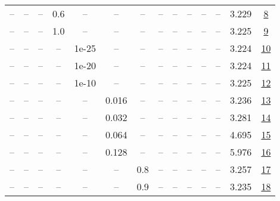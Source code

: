\begin{table}[H]
\begin{tabular}{cccccccccccccc}
-- & -- & -- & 0.6 & -- & -- & -- & -- & -- & -- & -- & -- & 3.229 & \href{https://wandb.ai/stanford-mercury/optimizer-scaling/runs/sweep-300m-6B-muon4ce9f6lr0.008-wd0.1-minlr0-warmup0-b10.8-b20.9-073a16}{8} \\
-- & -- & -- & 1.0 & -- & -- & -- & -- & -- & -- & -- & -- & 3.225 & \href{https://wandb.ai/stanford-mercury/optimizer-scaling/runs/sweep-300m-6B-muon202a7elr0.008-wd0.1-minlr0-warmup0-b10.8-b20.9-73a2de}{9} \\
-- & -- & -- & -- & 1e-25 & -- & -- & -- & -- & -- & -- & -- & 3.224 & \href{https://wandb.ai/stanford-mercury/optimizer-scaling/runs/sweep-300m-6B-muone40a7blr0.008-wd0.1-minlr0-warmup0-b10.8-b20.9-033569}{10} \\
-- & -- & -- & -- & 1e-20 & -- & -- & -- & -- & -- & -- & -- & 3.224 & \href{https://wandb.ai/stanford-mercury/optimizer-scaling/runs/sweep-300m-6B-muon77a589lr0.008-wd0.1-minlr0-warmup0-b10.8-b20.9-ccc1c0}{11} \\
-- & -- & -- & -- & 1e-10 & -- & -- & -- & -- & -- & -- & -- & 3.225 & \href{https://wandb.ai/stanford-mercury/optimizer-scaling/runs/sweep-300m-6B-muon7e5c17lr0.008-wd0.1-minlr0-warmup0-b10.8-b20.9-a739dc}{12} \\
-- & -- & -- & -- & -- & 0.016 & -- & -- & -- & -- & -- & -- & 3.236 & \href{https://wandb.ai/stanford-mercury/optimizer-scaling/runs/sweep-300m-6B-muon5f44d2lr0.016-wd0.1-minlr0-warmup0-b10.8-b20.9-e34d49}{13} \\
-- & -- & -- & -- & -- & 0.032 & -- & -- & -- & -- & -- & -- & 3.281 & \href{https://wandb.ai/stanford-mercury/optimizer-scaling/runs/sweep-300m-6B-muond0d176lr0.032-wd0.1-minlr0-warmup0-b10.8-b20.9-6c02c2}{14} \\
-- & -- & -- & -- & -- & 0.064 & -- & -- & -- & -- & -- & -- & 4.695 & \href{https://wandb.ai/stanford-mercury/optimizer-scaling/runs/sweep-300m-6B-muon587e80lr0.064-wd0.1-minlr0-warmup0-b10.8-b20.9-c81b6f}{15} \\
-- & -- & -- & -- & -- & 0.128 & -- & -- & -- & -- & -- & -- & 5.976 & \href{https://wandb.ai/stanford-mercury/optimizer-scaling/runs/sweep-300m-6B-muona26da7lr0.128-wd0.1-minlr0-warmup0-b10.8-b20.9-8bdb6d}{16} \\
-- & -- & -- & -- & -- & -- & 0.8 & -- & -- & -- & -- & -- & 3.257 & \href{https://wandb.ai/stanford-mercury/optimizer-scaling/runs/sweep-300m-6B-muonb24f84lr0.008-wd0.1-minlr0-warmup0-b10.8-b20.9-22bf93}{17} \\
-- & -- & -- & -- & -- & -- & 0.9 & -- & -- & -- & -- & -- & 3.235 & \href{https://wandb.ai/stanford-mercury/optimizer-scaling/runs/sweep-300m-6B-muon607e74lr0.008-wd0.1-minlr0-warmup0-b10.8-b20.9-4429b0}{18} \\

\end{tabular}
\end{table}
